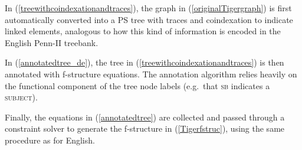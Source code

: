 \documentclass[output=paper,hidelinks]{langscibook}
\begin{document}
In (\ref{treewithcoindexationandtraces}), the graph in
(\ref{originalTigergraph})
is first automatically converted into a PS tree with traces and coindexation to indicate linked elements, analogous to how this kind of information is encoded in the English Penn-II treebank.


\ea
\label{treewithcoindexationandtraces}
\z

In (\ref{annotatedtree_de}), the tree in (\ref{treewithcoindexationandtraces}) is then annotated with f-structure equations. The annotation algorithm relies heavily on the functional component of the tree node labels (e.g.\ that {\scshape sb} indicates a {\scshape subject}). 


\ea
\label{annotatedtree_de}
\scalebox{.7}{\hspace*{-2.5cm}\begin{forest}
[TOP [\$*LRB* [``]]
  [S [{CNP-SB\\{\UP}subj=\DOWN} [{NN-CJ\\{\DOWN}$\in$({\UP}conj} [Gesch\"aftemachen]] [*T1*-CD [-]] [*T2*-CJ [-]]]
     [{VAFIN-HD\\\UP=\DOWN} [ist]]
     [{NP-PD\\{\UP}xcomp.pred=\DOWN} [{PPOSAT-NK\\{\UP}spec:poss=\DOWN} [seine]] [{NN-NK\\\UP=\DOWN} [Welt]]]
     [{KON-*T1*\\{\UP}subj=\DOWN} [und]]
     [{NP-*T2*\\{\DOWN}$\in${\UP}subj:conj} [{PTKNEG-NG\\\DOWN$\in${\UP}adjunct} [nicht]] [{ART-NK\\{\UP}spec:det=\DOWN} [die]] [{NN-NK\\UP=\DOWN} [Politik]]]]
  [\$. [.]]]]
\end{forest}}
\z

Finally, the equations in (\ref{annotatedtree}) are collected and passed through a constraint solver to generate the f-structure in (\ref{Tigerfstruc}), using the same procedure as for English.
\end{document}
